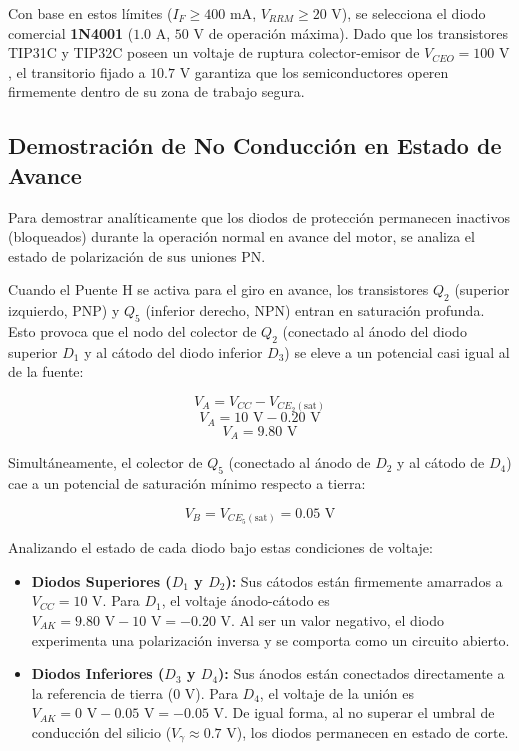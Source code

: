 \documentclass[journal]{IEEEtran}
\begin{document}
    Con base en estos límites ($I_F \geq 400\text{ mA}$, $V_{RRM} \geq 20\text{ V}$), se selecciona el diodo comercial \textbf{1N4001} ($1.0\text{ A}$, $50\text{ V}$ de operación máxima). Dado que los transistores TIP31C y TIP32C poseen un voltaje de ruptura colector-emisor de $V_{CEO} = 100\text{ V}$, el transitorio fijado a $10.7\text{ V}$ garantiza que los semiconductores operen firmemente dentro de su zona de trabajo segura.

    \subsection{Demostración de No Conducción en Estado de Avance}

    Para demostrar analíticamente que los diodos de protección permanecen inactivos (bloqueados) durante la operación normal en avance del motor, se analiza el estado de polarización de sus uniones PN.

    Cuando el Puente H se activa para el giro en avance, los transistores $Q_2$ (superior izquierdo, PNP) y $Q_5$ (inferior derecho, NPN) entran en saturación profunda. Esto provoca que el nodo del colector de $Q_2$ (conectado al ánodo del diodo superior $D_1$ y al cátodo del diodo inferior $D_3$) se eleve a un potencial casi igual al de la fuente:

    \begin{equation*}
        V_{A} = V_{CC} - V_{CE_{2}(\text{sat})}
    \end{equation*}
    \begin{equation*}
        V_{A} = 10\text{ V} - 0.20\text{ V}
    \end{equation*}
    \begin{equation*}
        V_{A} = 9.80\text{ V}
    \end{equation*}

    Simultáneamente, el colector de $Q_5$ (conectado al ánodo de $D_2$ y al cátodo de $D_4$) cae a un potencial de saturación mínimo respecto a tierra:

    \begin{equation}
        V_{B} = V_{CE_{5}(\text{sat})} = 0.05\text{ V}
    \end{equation}

    Analizando el estado de cada diodo bajo estas condiciones de voltaje:
    \begin{itemize}
        \item \textbf{Diodos Superiores ($D_1$ y $D_2$):} Sus cátodos están firmemente amarrados a $V_{CC} = 10\text{ V}$. Para $D_1$, el voltaje ánodo-cátodo es $V_{AK} = 9.80\text{ V} - 10\text{ V} = -0.20\text{ V}$. Al ser un valor negativo, el diodo experimenta una polarización inversa y se comporta como un circuito abierto.
        \item \textbf{Diodos Inferiores ($D_3$ y $D_4$):} Sus ánodos están conectados directamente a la referencia de tierra ($0\text{ V}$). Para $D_4$, el voltaje de la unión es $V_{AK} = 0\text{ V} - 0.05\text{ V} = -0.05\text{ V}$. De igual forma, al no superar el umbral de conducción del silicio ($V_{\gamma} \approx 0.7\text{ V}$), los diodos permanecen en estado de corte.
    \end{itemize}
    
\end{document}

